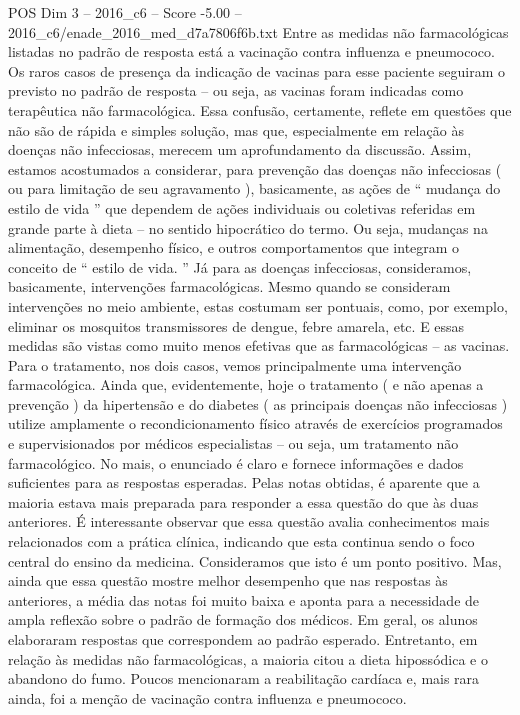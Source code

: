 \begin{textsample}{POS Dim 3 – 2016\_c6 – Score -5.00 – 2016\_c6/enade\_2016\_med\_d7a7806f6b.txt}
Entre as medidas não farmacológicas listadas no padrão de resposta está a vacinação contra influenza e pneumococo.
Os raros casos de presença da indicação de vacinas para esse paciente seguiram o previsto no padrão de resposta – ou seja, as vacinas foram indicadas como terapêutica não farmacológica.
Essa confusão, certamente, reflete em questões que não são de rápida e simples solução, mas que, especialmente em relação às doenças não infecciosas, merecem um aprofundamento da discussão.
Assim, estamos acostumados a considerar, para prevenção das doenças não infecciosas ( ou para limitação de seu agravamento ), basicamente, as ações de “ mudança do estilo de vida ” que dependem de ações individuais ou coletivas referidas em grande parte à dieta – no sentido hipocrático do termo.
Ou seja, mudanças na alimentação, desempenho físico, e outros comportamentos que integram o conceito de “ estilo de vida. ” Já para as doenças infecciosas, consideramos, basicamente, intervenções farmacológicas.
Mesmo quando se consideram intervenções no meio ambiente, estas costumam ser pontuais, como, por exemplo, eliminar os mosquitos transmissores de dengue, febre amarela, etc.
E essas medidas são vistas como muito menos efetivas que as farmacológicas – as vacinas.
Para o tratamento, nos dois casos, vemos principalmente uma intervenção farmacológica.
Ainda que, evidentemente, hoje o tratamento ( e não apenas a prevenção ) da hipertensão e do diabetes ( as principais doenças não infecciosas ) utilize amplamente o recondicionamento físico através de exercícios programados e supervisionados por médicos especialistas – ou seja, um tratamento não farmacológico.
No mais, o enunciado é claro e fornece informações e dados suficientes para as respostas esperadas.
Pelas notas obtidas, é aparente que a maioria estava mais preparada para responder a essa questão do que às duas anteriores.
É interessante observar que essa questão avalia conhecimentos mais relacionados com a prática clínica, indicando que esta continua sendo o foco central do ensino da medicina.
Consideramos que isto é um ponto positivo.
Mas, ainda que essa questão mostre melhor desempenho que nas respostas às anteriores, a média das notas foi muito baixa e aponta para a necessidade de ampla reflexão sobre o padrão de formação dos médicos.
Em geral, os alunos elaboraram respostas que correspondem ao padrão esperado.
Entretanto, em relação às medidas não farmacológicas, a maioria citou a dieta hipossódica e o abandono do fumo.
Poucos mencionaram a reabilitação cardíaca e, mais rara ainda, foi a menção de vacinação contra influenza e pneumococo.

\end{textsample}
